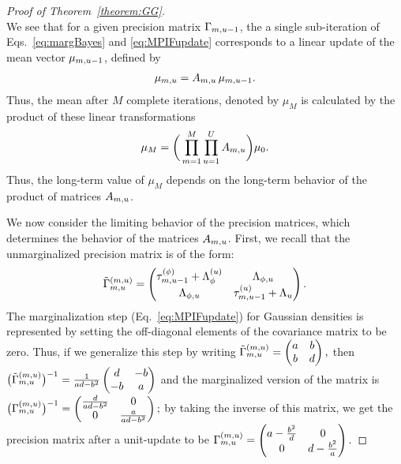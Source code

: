 \begin{proof}[Proof of Theorem~\ref{theorem:GG}]
\begin{equation*}
\end{equation*}
We see that for a given precision matrix $\Gamma_{m, u-1}$, the a single sub-iteration of Eqs.~\ref{eq:margBayes} and \ref{eq:MPIFupdate} corresponds to a linear update of the mean vector $\mu_{m, u-1}$, defined by
\begin{align*}
  \mu_{m, u} = A_{m, u} \, \mu_{m, u-1}.
\end{align*}
Thus, the mean after $M$ complete iterations, denoted by $\mu_{M}$ is calculated by the product of these linear transformations
\begin{align*}
  \mu_M = \bigg(\prod_{m = 1}^M\prod_{u = 1}^U A_{m, u}\bigg)\mu_0. 
\end{align*}
Thus, the long-term value of $\mu_M$ depends on the long-term behavior of the product of matrices $A_{m, u}$. 

We now consider the limiting behavior of the precision matrices, which determines the behavior of the matrices $A_{m, u}$. 
First, we recall that the unmarginalized precision matrix is of the form:
\begin{align*}
  {\tilde{\Gamma}}^{(m, u)}_{m, u} = \begin{pmatrix}
  \tau^{(\phi)}_{m, u-1} + \Lambda^{(u)}_{\phi} & \Lambda_{\phi, u} \\ 
  \Lambda_{\phi, u} & \tau^{(u)}_{m, u-1} + \Lambda_{u}\end{pmatrix}. 
\end{align*}
The marginalization step (Eq.~\ref{eq:MPIFupdate}) for Gaussian densities is represented by setting the off-diagonal elements of the covariance matrix to be zero.
Thus, if we generalize this step by writing
$
{\tilde{\Gamma}}^{(m, u)}_{m, u} = \begin{pmatrix}a & b \\ b & d \end{pmatrix},
$
then
$
\big({\tilde{\Gamma}}^{(m, u)}_{m, u}\big)^{-1} = \frac{1}{ad - b^2}\begin{pmatrix}d & -b \\ -b & a\end{pmatrix}
$
and the marginalized version of the matrix is
$
\big(\Gamma^{(m, u)}_{m, u}\big)^{-1} = 
    \begin{pmatrix} \frac{d}{ad-b^2} & 0 \\ 0 & \frac{a}{ad-b^2}\end{pmatrix};
$
by taking the inverse of this matrix, we get the precision matrix after a unit-update to be
$
   \Gamma^{(m, u)}_{m, u} = \begin{pmatrix} a - \frac{b^2}{d} & 0 \\ 0 & d-\frac{b^2}{a}\end{pmatrix}.
$


\end{proof}
